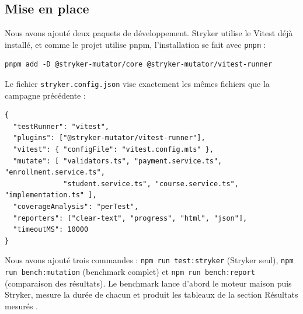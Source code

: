 \documentclass[12pt,a4paper]{article}
\begin{document}
\subsection{Mise en place}
Nous avons ajouté deux paquets de développement. Stryker utilise le Vitest déjà installé, et comme le projet utilise pnpm, l'installation se fait avec \texttt{pnpm} :
\begin{lstlisting}[language={},showstringspaces=false]
pnpm add -D @stryker-mutator/core @stryker-mutator/vitest-runner
\end{lstlisting}
Le fichier \texttt{stryker.config.json} vise exactement les mêmes fichiers que la campagne précédente :
\begin{lstlisting}[language={},showstringspaces=false,basicstyle=\ttfamily\scriptsize]
{
  "testRunner": "vitest",
  "plugins": ["@stryker-mutator/vitest-runner"],
  "vitest": { "configFile": "vitest.config.mts" },
  "mutate": [ "validators.ts", "payment.service.ts", "enrollment.service.ts",
              "student.service.ts", "course.service.ts", "implementation.ts" ],
  "coverageAnalysis": "perTest",
  "reporters": ["clear-text", "progress", "html", "json"],
  "timeoutMS": 10000
}
\end{lstlisting}
Nous avons ajouté trois commandes : \texttt{npm run test:stryker} (Stryker seul), \texttt{npm run bench:mutation} (benchmark complet) et \texttt{npm run bench:report} (comparaison des résultats). Le benchmark lance d'abord le moteur maison puis Stryker, mesure la durée de chacun et produit les tableaux de la section \og Résultats mesurés \fg{}.
\end{document}
